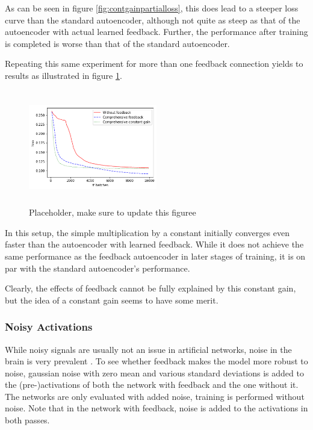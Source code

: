 \documentclass{article}
\begin{document}
  As can be seen in figure \ref{fig:contgainpartialloss}, this does lead to a steeper loss curve than the standard autoencoder, although not quite as steep as that of the autoencoder with actual learned feedback. Further, the performance after training is completed is worse than that of the standard autoencoder. 
  
  Repeating this same experiment for more than one feedback connection yields to results as illustrated in figure \ref{fig:contgainfullloss}. 
  
  \begin{figure}
      \centering
      \includegraphics[width=0.5\textwidth,height=5cm,keepaspectratio]{img/constgainfull_loss.png}
      \caption{Placeholder, make sure to update this figuree}
      \label{fig:contgainfullloss}
  \end{figure}
  
  In this setup, the simple multiplication by a constant initially converges even faster than the autoencoder with learned feedback. While it does not achieve the same performance as the feedback autoencoder in later stages of training, it is on par with the standard autoencoder's performance. 
  
  Clearly, the effects of feedback cannot be fully explained by this constant gain, but the idea of a constant gain seems to have some merit. 


\subsubsection{Noisy Activations} 
\label{noisyacts}
While noisy signals are usually not an issue in artificial networks, noise in the brain is very prevalent \cite{Faisal2008}. To see whether feedback makes the model more robust to noise, gaussian noise with zero mean and various standard deviations is added to the (pre-)activations of both the network with feedback and the one without it. The networks are only evaluated with added noise, training is performed without noise. Note that in the network with feedback, noise is added to the activations in both passes.    
\end{document}
